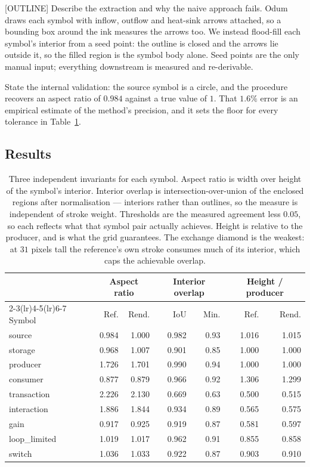[OUTLINE] Describe the extraction and why the naive approach fails. Odum draws
each symbol with inflow, outflow and heat-sink arrows attached, so a bounding
box around the ink measures the arrows too. We instead flood-fill each symbol's
interior from a seed point: the outline is closed and the arrows lie outside it,
so the filled region is the symbol body alone. Seed points are the only manual
input; everything downstream is measured and re-derivable.

State the internal validation: the source symbol is a circle, and the procedure
recovers an aspect ratio of $0.984$ against a true value of $1$. That $1.6\%$
error is an empirical estimate of the method's precision, and it sets the floor
for every tolerance in Table~\ref{tab:conformance}.

\subsection{Results}

\begin{table}[htbp]
\centering
\begin{tabular}{lrrrrrr}
\toprule
& \multicolumn{2}{c}{Aspect ratio} & \multicolumn{2}{c}{Interior overlap}
& \multicolumn{2}{c}{Height / producer} \\
\cmidrule(lr){2-3}\cmidrule(lr){4-5}\cmidrule(lr){6-7}
Symbol & Ref. & Rend. & IoU & Min. & Ref. & Rend. \\
\midrule
source        & 0.984 & 1.000 & 0.982 & 0.93 & 1.016 & 1.015 \\
storage       & 0.968 & 1.007 & 0.901 & 0.85 & 1.000 & 1.000 \\
producer      & 1.726 & 1.701 & 0.990 & 0.94 & 1.000 & 1.000 \\
consumer      & 0.877 & 0.879 & 0.966 & 0.92 & 1.306 & 1.299 \\
transaction   & 2.226 & 2.130 & 0.669 & 0.63 & 0.500 & 0.515 \\
interaction   & 1.886 & 1.844 & 0.934 & 0.89 & 0.565 & 0.575 \\
gain          & 0.917 & 0.925 & 0.919 & 0.87 & 0.581 & 0.597 \\
loop\_limited & 1.019 & 1.017 & 0.962 & 0.91 & 0.855 & 0.858 \\
switch        & 1.036 & 1.033 & 0.922 & 0.87 & 0.903 & 0.910 \\
\bottomrule
\end{tabular}
\caption{Three independent invariants for each symbol. Aspect ratio is width over
height of the symbol's interior. Interior overlap is intersection-over-union of
the enclosed regions after normalisation --- interiors rather than outlines, so
the measure is independent of stroke weight. Thresholds are the measured
agreement less $0.05$, so each reflects what that symbol pair actually achieves.
Height is relative to the producer, and is what the grid guarantees. The
exchange diamond is the weakest: at $31$ pixels tall the reference's own stroke
consumes much of its interior, which caps the achievable overlap.}
\label{tab:conformance}
\end{table}

